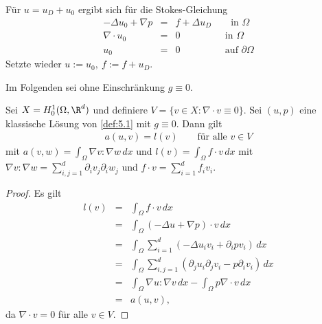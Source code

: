Für $u = u_D + u_0$ ergibt sich für die Stokes-Gleichung
\begin{eqnarray*}
    -\Delta u_0 + \nabla p &=& f + \Delta u_D
    \qquad \text{in } \Omega \\
    \nabla \cdot u_0 &=& 0
    \qquad \qquad \ \ \ \text{in } \Omega \\
    u_0 &=& 0
    \qquad \qquad \ \ \ \text{auf } \partial\Omega
\end{eqnarray*}
Setzte wieder $u := u_0, \ f:= f + u_D$.

Im Folgenden sei ohne Einschränkung $g \equiv 0$.


\begin{Lemma}
    \label{lem:5.2}
    Sei $X = H^1_0(\Omega, \R^d)$ und definiere
    $V = \{v\in X: \nabla \cdot v \equiv 0\}$. Sei $(u,p)$ eine klassische
    Lösung von \eqref{def:5.1} mit $g\equiv 0$. Dann gilt
    \begin{eqnarray*}
        a(u, v) = l(v)
        \qquad \text{für alle } v\in V
    \end{eqnarray*}
    mit $a(v,w) = \int_\Omega \nabla v : \nabla w\, dx$ und  
    $l(v) = \int_\Omega f \cdot v\, dx$ mit
    $\nabla v : \nabla w = \sum_{i,j = 1}^d \partial_i v_j \partial_i w_j$ und
    $f \cdot v = \sum_{i = 1}^d f_i v_i$.
\end{Lemma}


\begin{proof}
    Es gilt
    \begin{eqnarray*}
            l(v)
        &=& \int_\Omega f \cdot v \,dx \\
        &=& \int_\Omega (-\Delta u + \nabla p) \cdot v \,dx \\
        &=& \int_\Omega \sum_{i = 1}^d (-\Delta u_i v_i + \partial_i p v_i)
            \,dx \\
        &=& \int_\Omega \sum_{i,j = 1}^d (\partial_j u_i
            \partial_j v_i - p \partial_i v_i) \,dx \\
        &=& \int_\Omega \nabla u : \nabla v \,dx
            - \int_\Omega p \nabla \cdot v \,dx \\
        &=& a(u , v),
    \end{eqnarray*}
    da $\nabla \cdot v = 0$ für alle $v\in V$.
\end{proof}


